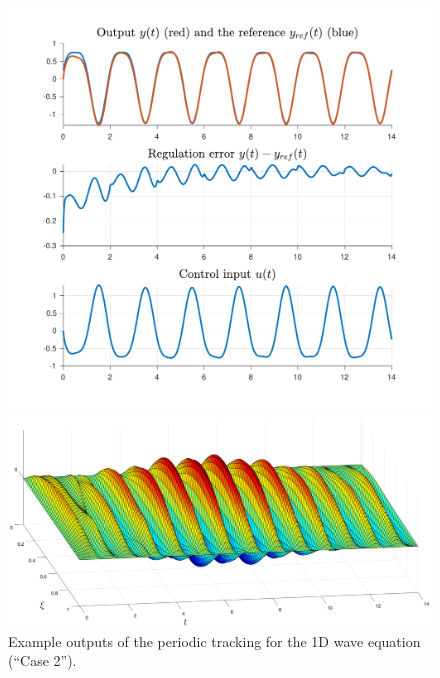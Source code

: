 \documentclass[11pt, a4paper]{amsart}
\theoremstyle{definition}
\numberwithin{equation}{section}
\begin{document}
\begin{figure}[h!]
  \centering
  \begin{minipage}{0.43\linewidth}
    \begin{flushleft}
      \includegraphics[width=0.95\linewidth]{W1D2outputs.pdf}
    \end{flushleft}
  \end{minipage}
  \begin{minipage}{0.55\linewidth}
    \begin{flushright}
      \includegraphics[width=\linewidth]{W1D2profile.png}
    \end{flushright}
  \end{minipage}

    \caption{Example outputs of the periodic tracking for the 1D wave equation (``Case 2'').}
  \label{fig:1Dwave2}
\end{figure}
\end{document}
